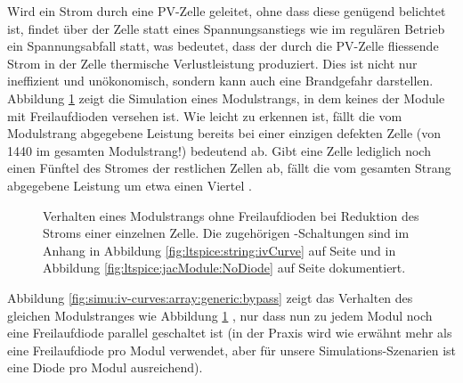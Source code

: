 \clearpage
Wird   ein   Strom   durch   eine   PV-Zelle   geleitet,   ohne   dass   diese
gen\"ugend   belichtet   ist,   findet    \"uber   der   Zelle   statt   eines
Spannungsanstiegs  wie  im  regul\"aren  Betrieb  ein  Spannungsabfall  statt,
was   bedeutet,   dass   der   durch  die   PV-Zelle   fliessende   Strom   in
der   Zelle  thermische   Verlustleistung  produziert. Dies   ist  nicht   nur
ineffizient   und  un\"okonomisch,   sondern   kann   auch  eine   Brandgefahr
darstellen. Abbildung    \ref{fig:simu:iv-curves:array:generic}   zeigt    die
Simulation eines  Modulstrangs, in  dem keines  der Module  mit Freilaufdioden
versehen  ist. Wie  leicht  zu  erkennen  ist,  f\"allt  die  vom  Modulstrang
abgegebene Leistung  bereits bei  einer einzigen defekten  Zelle (von  1440 im
gesamten  Modulstrang!) bedeutend  ab. Gibt  eine Zelle  lediglich noch  einen
F\"unftel  des Stromes  der restlichen  Zellen  ab, f\"allt  die vom  gesamten
Strang  abgegebene  Leistung  um  etwa einen  Viertel  .


\begin{figure}[h!tb]
    \centering
    
    \caption[%
        IV- und PV-Kurven eines Modulsstrangs bei Leistungseinbruch,
        keine Freilaufdioden%
    ]
    {%
        Verhalten       eines      Modulstrangs       ohne      Freilaufdioden
        bei     Reduktion     des     Stroms    einer     einzelnen     Zelle.
        Die      zugeh\"origen     -Schaltungen      sind     im
        Anhang       in       Abbildung       \ref{fig:ltspice:string:ivCurve}
        auf     Seite      \pageref{fig:ltspice:string:ivCurve}     und     in
        Abbildung      \ref{fig:ltspice:jacModule:NoDiode}      auf      Seite
        \pageref{fig:ltspice:jacModule:NoDiode} dokumentiert.%
    }
    \label{fig:simu:iv-curves:array:generic}
\end{figure}

\clearpage
Abbildung     \ref{fig:simu:iv-curves:array:generic:bypass}      zeigt     das
Verhalten       des      gleichen       Modulstranges      wie       Abbildung
\ref{fig:simu:iv-curves:array:generic} , nur dass nun zu jedem Modul noch eine
Freilaufdiode  parallel  geschaltet ist  (in  der  Praxis wird  wie  erw\"ahnt
mehr  als   eine  Freilaufdiode  pro   Modul  verwendet,  aber   f\"ur  unsere
Simulations-Szenarien ist eine Diode pro Modul ausreichend).

